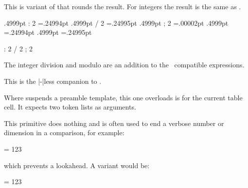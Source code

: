 This is variant of  that rounds the result. For integers the result
is the same as .

\startbuffer
\the\dimexpr .4999pt                     : 2 \relax            =.24994pt
\the\dimexpr .4999pt                     / 2 \relax            =.24995pt
\the\dimexpr .4999pt                     ; 2 \relax            =.00002pt
\scratchdimen.4999pt \divide {} \the\scratchdimen =.24994pt
\scratchdimen.4999pt \edivide{} \the\scratchdimen =.24995pt
\scratchdimen 4999pt \rdivide{} \the\scratchdimen =2500.0pt
\scratchdimen 5000pt \rdivide{} \the\scratchdimen =2500.0pt

\the{}                       : 2 
\the{}                       / 2 
\the{}                       ; 2 
 \divide {} \the{}
 \edivide{} \the{}
 \rdivide{} \the{}
\stopbuffer

\typebuffer

\startlines
\getbuffer
\stoplines

The integer division \type{:} and modulo \type {;} are an addition to the \ETEX\
compatible expressions.

\stopnewprimitive

\startnewprimitive[title={\prm {rdivideby}}]

This is the |-|less companion to .

\stopnewprimitive

\startnewprimitive[title={\prm {realign}}]

Where  suspends a preamble template, this one overloads is for the
current table cell. It expects two token lists as arguments.

\stopnewprimitive

\startoldprimitive[title={\prm {relax}}]

This primitive does nothing and is often used to end a verbose number or
dimension in a comparison, for example:

\starttyping
\ifnum \scratchcounter = 123\relax
\stoptyping

which prevents a lookahead. A variant would be:

\starttyping
\ifnum \scratchcounter = 123 %
\stoptyping

